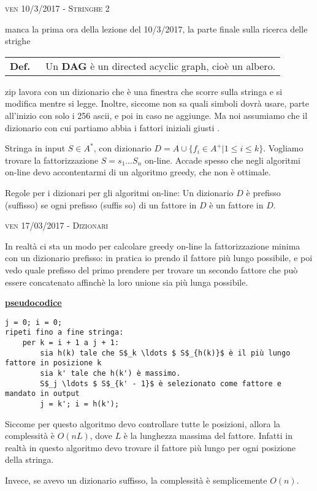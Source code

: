 \documentclass[a4paper,10pt]{article} %
\newcommand{\malgorithm}[1]{%
    {\bigbreak \par \hspace*{4pt} \underline{\textbf {#1}}}}
\newcommand{\msection}[1]{%
    {\newpage\bigbreak \bigbreak \par \hfil \huge \textsc {#1}}\par}
\renewcommand{\b}[1]{%
    {\textbf{#1}}}
\newcommand{\mdef}[1]{%
    {\smallbreak\par\begin{tabular}{ll} \textbf{Def.$\;\;$} & \begin{minipage}[t]{0.80\columnwidth}\normalsize  {#1}\end{minipage}\tabularnewline \end{tabular}}\smallskip\par}
\begin{document}
\msection{ven 10/3/2017 - Stringhe 2}




{\huge manca la prima ora della lezione del 10/3/2017, la parte finale sulla ricerca delle strighe}

\mdef{Un \b{DAG} è un directed acyclic graph, cioè un albero.}

zip lavora con un dizionario che è una finestra che scorre sulla stringa e si modifica mentre si legge. Inoltre, siccome non sa quali simboli dovrà usare, parte all'inizio con solo i 256 ascii, e poi in caso ne aggiunge. Ma noi assumiamo che il dizionario con cui partiamo abbia i fattori iniziali giusti .

Stringa in input $S \in A^*$, con dizionario $D = A \cup \{ f_i \in A^+ | 1 \leq i \leq k \}$.
Vogliamo trovare la fattorizzazione $S = s_1 \ldots S_n$ on-line.
Accade spesso che negli algoritmi on-line devo accontentarmi di un algoritmo greedy, che non è ottimale.

Regole per i dizionari per gli algoritmi on-line: Un dizionario $D$ è prefisso (suffisso) se ogni prefisso (suffis
so) di un fattore in $D$ è un fattore in $D$.




\msection{ven 17/03/2017 - Dizionari}




In realtà ci sta un modo per calcolare greedy on-line la fattorizzazione minima con un dizionario prefisso: in pratica io prendo il fattore più lungo possibile, e poi vedo quale prefisso del primo prendere per trovare un secondo fattore che può essere concatenato affinchè la loro unione sia più lunga possibile.

\malgorithm {pseudocodice}
\begin{lstlisting}
j = 0; i = 0;
ripeti fino a fine stringa:
    per k = i + 1 a j + 1:
        sia h(k) tale che S$_k \ldots $ S$_{h(k)}$ è il più lungo fattore in posizione k
        sia k' tale che h(k') è massimo.
        S$_j \ldots $ S$_{k' - 1}$ è selezionato come fattore e mandato in output
        j = k'; i = h(k');
\end{lstlisting}
Siccome per questo algoritmo devo controllare tutte le posizioni, allora la complessità è $O(nL)$, dove $L$ è la lunghezza massima del fattore. Infatti in realtà in questo algoritmo devo trovare il fattore più lungo per ogni posizione della stringa. 

\bigskip
Invece, se avevo un dizionario suffisso, la complessità è semplicemente $O(n)$.
\end{document}
